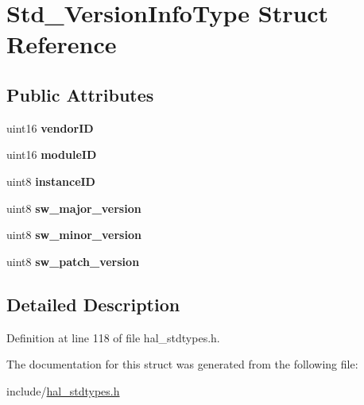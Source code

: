 \hypertarget{structStd__VersionInfoType}{}\section{Std\+\_\+\+Version\+Info\+Type Struct Reference}
\label{structStd__VersionInfoType}
\subsection*{Public Attributes}
\begin{DoxyCompactItemize}
\item 
\mbox{\label{structStd__VersionInfoType_a26055f45e3016862f87063d1feccea8d}} 
uint16 {\bfseries vendor\+ID}
\item 
\mbox{\label{structStd__VersionInfoType_a39e3d6d4bbac41bdba1e51e8876522d2}} 
uint16 {\bfseries module\+ID}
\item 
\mbox{\label{structStd__VersionInfoType_af79925c1afbf00665aefcb18c90db619}} 
uint8 {\bfseries instance\+ID}
\item 
\mbox{\label{structStd__VersionInfoType_ad08a3e87fe83d635d0d28fd6e99271af}} 
uint8 {\bfseries sw\+\_\+major\+\_\+version}
\item 
\mbox{\label{structStd__VersionInfoType_ab27f4e07c28199c14e79d44a3ea09008}} 
uint8 {\bfseries sw\+\_\+minor\+\_\+version}
\item 
\mbox{\label{structStd__VersionInfoType_af9854c941ce22e88a1718fd2aa183c3c}} 
uint8 {\bfseries sw\+\_\+patch\+\_\+version}
\end{DoxyCompactItemize}


\subsection{Detailed Description}


Definition at line 118 of file hal\+\_\+stdtypes.\+h.



The documentation for this struct was generated from the following file\+:\begin{DoxyCompactItemize}
\item 
include/\mbox{\hyperlink{hal__stdtypes_8h}{hal\+\_\+stdtypes.\+h}}\end{DoxyCompactItemize}
